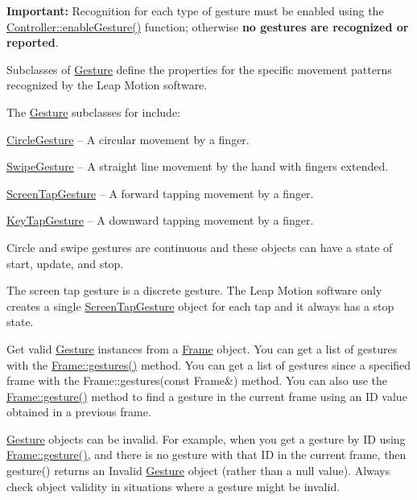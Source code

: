 {\bfseries Important\+:} Recognition for each type of gesture must be enabled using the \hyperlink{class_leap_1_1_controller_ad24410dee9de51b16ceb6b8c97fe5a36}{Controller\+::enable\+Gesture()} function; otherwise {\bfseries no gestures are recognized or reported}.

Subclasses of \hyperlink{class_leap_1_1_gesture}{Gesture} define the properties for the specific movement patterns recognized by the Leap Motion software.

The \hyperlink{class_leap_1_1_gesture}{Gesture} subclasses for include\+:


\begin{DoxyItemize}
\item \hyperlink{class_leap_1_1_circle_gesture}{Circle\+Gesture} -- A circular movement by a finger.
\item \hyperlink{class_leap_1_1_swipe_gesture}{Swipe\+Gesture} -- A straight line movement by the hand with fingers extended.
\item \hyperlink{class_leap_1_1_screen_tap_gesture}{Screen\+Tap\+Gesture} -- A forward tapping movement by a finger.
\item \hyperlink{class_leap_1_1_key_tap_gesture}{Key\+Tap\+Gesture} -- A downward tapping movement by a finger.
\end{DoxyItemize}

Circle and swipe gestures are continuous and these objects can have a state of start, update, and stop.

The screen tap gesture is a discrete gesture. The Leap Motion software only creates a single \hyperlink{class_leap_1_1_screen_tap_gesture}{Screen\+Tap\+Gesture} object for each tap and it always has a stop state.

Get valid \hyperlink{class_leap_1_1_gesture}{Gesture} instances from a \hyperlink{class_leap_1_1_frame}{Frame} object. You can get a list of gestures with the \hyperlink{class_leap_1_1_frame_a4e4dfb7dbe7796d836fdbec255909379}{Frame\+::gestures()} method. You can get a list of gestures since a specified frame with the {\ttfamily Frame\+::gestures(const Frame\&)} method. You can also use the {\ttfamily \hyperlink{class_leap_1_1_frame_afb0577b99e3bc259c4e20a710062c926}{Frame\+::gesture()}} method to find a gesture in the current frame using an I\+D value obtained in a previous frame.

\hyperlink{class_leap_1_1_gesture}{Gesture} objects can be invalid. For example, when you get a gesture by I\+D using {\ttfamily \hyperlink{class_leap_1_1_frame_afb0577b99e3bc259c4e20a710062c926}{Frame\+::gesture()}}, and there is no gesture with that I\+D in the current frame, then {\ttfamily gesture()} returns an Invalid \hyperlink{class_leap_1_1_gesture}{Gesture} object (rather than a null value). Always check object validity in situations where a gesture might be invalid.

